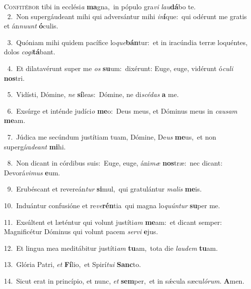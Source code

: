 \lettrine{\initial\textcolor{\initialcolor}{C}}{onfitébor} tibi in ecclési\textit{a} \textbf{ma}\-gna,~\star in pópulo gra\textit{vi} \textit{lau}\-\textbf{dá}bo te.\\
{\numbfont\textcolor{\numbcolor}{~2.}}~Non supergáudeant mihi qui adversántur mihi \textit{in}\-\textbf{í}que:~\star qui odérunt me gratis et án\-\textit{nu}\-\textit{unt} \textbf{ó}\-culis.\par
{\numbfont\textcolor{\numbcolor}{~3.}}~Quóniam mihi quidem pacífice lo\-\textit{que}\-\textbf{bán}tur:~\star et in iracúndia terræ loquéntes, dolos \textit{co}\-\textit{gi}\textbf{tá}bant.\par
{\numbfont\textcolor{\numbcolor}{~4.}}~Et dilatavérunt super me \textit{os} \textbf{su}\-um:~\star dixérunt: Euge, euge, vidérunt ó\-\textit{cu}\-\textit{li} \textbf{nos}\-tri.\par
{\numbfont\textcolor{\numbcolor}{~5.}}~Vidísti, Dómine, \textit{ne} \textbf{sí}\-leas:~\star Dómine, ne di\-\textit{scé}\-\textit{das} \textbf{a} me.\par
{\numbfont\textcolor{\numbcolor}{~6.}}~Exsúrge et inténde judíci\textit{o} \textbf{me}\-o:~\star Deus meus, et Dóminus meus in \textit{cau}\-\textit{sam} \textbf{me}\-am.\par
{\numbfont\textcolor{\numbcolor}{~7.}}~Júdica me secúndum justítiam tuam, Dómine, De\textit{us} \textbf{me}\-us,~\star et non supergáu\-\textit{de}\-\textit{ant} \textbf{mi}\-hi.\par
{\numbfont\textcolor{\numbcolor}{~8.}}~Non dicant in córdibus suis:~\dagger Euge, euge, áni\textit{mæ} \textbf{nos}\-træ:~\star nec dicant: Devorá\-\textit{vi}\-\textit{mus} \textbf{e}\-um.\par
{\numbfont\textcolor{\numbcolor}{~9.}}~Erubéscant et revereán\textit{tur} \textbf{si}\-mul,~\star qui gratulántur \textit{ma}\-\textit{lis} \textbf{me}\-is.\par
{\numbfont\textcolor{\numbcolor}{10.}}~Induántur confusióne et re\-\textit{ve}\-\textbf{rén}tia~\star qui magna lo\-\textit{quún}\-\textit{tur} \textbf{su}\-per me.\par
{\numbfont\textcolor{\numbcolor}{11.}}~Exsúltent et læténtur qui volunt justíti\textit{am} \textbf{me}\-am:~\star et dicant semper: Magnificétur Dóminus qui volunt pacem \textit{ser}\-\textit{vi} \textbf{e}\-jus.\par
{\numbfont\textcolor{\numbcolor}{12.}}~Et lingua mea meditábitur justíti\textit{am} \textbf{tu}\-am,~\star tota die \textit{lau}\-\textit{dem} \textbf{tu}\-am.\par
{\numbfont\textcolor{\numbcolor}{13.}}~Glória Patri, \textit{et} \textbf{Fí}\-lio,~\star et Spirí\-\textit{tu}\-\textit{i} \textbf{Sanc}\-to.\par
{\numbfont\textcolor{\numbcolor}{14.}}~Sicut erat in princípio, et nunc, \textit{et} \textbf{sem}\-per,~\star et in sǽcula sæcu\-\textit{ló}\-\textit{rum}. \textbf{A}\-men.\par
